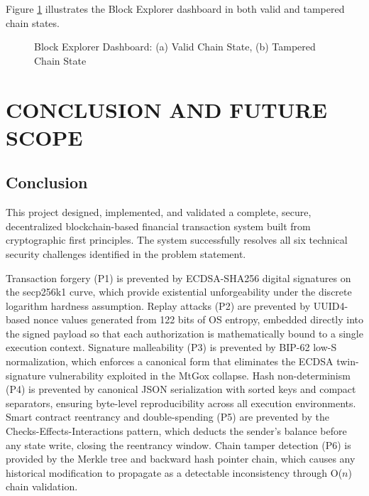 \documentclass[12pt,a4paper]{report}
\begin{document}
Figure \ref{fig:results} illustrates the Block Explorer dashboard in both valid and
tampered chain states.

\begin{figure}[H]
  \centering
  \caption{Block Explorer Dashboard: (a) Valid Chain State, (b) Tampered Chain State}
  \label{fig:results}
\end{figure}

\chapter{CONCLUSION AND FUTURE SCOPE}

\section{Conclusion}

This project designed, implemented, and validated a complete, secure, decentralized
blockchain-based financial transaction system built from cryptographic first principles.
The system successfully resolves all six technical security challenges identified in the
problem statement.

Transaction forgery (P1) is prevented by ECDSA-SHA256 digital signatures on the secp256k1
curve, which provide existential unforgeability under the discrete logarithm hardness
assumption. Replay attacks (P2) are prevented by UUID4-based nonce values generated from
122 bits of OS entropy, embedded directly into the signed payload so that each authorization
is mathematically bound to a single execution context. Signature malleability (P3) is
prevented by BIP-62 low-S normalization, which enforces a canonical form that eliminates
the ECDSA twin-signature vulnerability exploited in the MtGox collapse. Hash
non-determinism (P4) is prevented by canonical JSON serialization with sorted keys and
compact separators, ensuring byte-level reproducibility across all execution environments.
Smart contract reentrancy and double-spending (P5) are prevented by the Checks-Effects-Interactions
pattern, which deducts the sender's balance before any state write, closing the reentrancy
window. Chain tamper detection (P6) is provided by the Merkle tree and backward hash
pointer chain, which causes any historical modification to propagate as a detectable
inconsistency through O($n$) chain validation.
\end{document}
